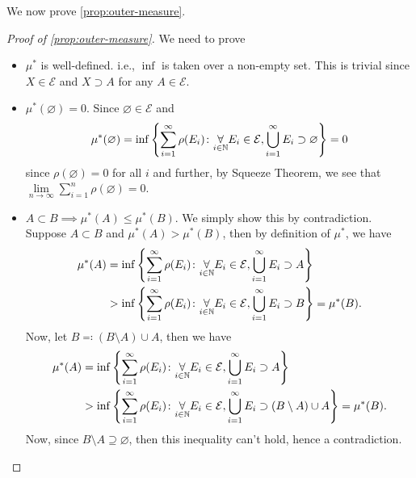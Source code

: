 We now prove \autoref{prop:outer-measure}.
\begin{proof}[Proof of \autoref{prop:outer-measure}]
	We need to prove
	\begin{itemize}
		\item \(\mu^{*} \) is well-defined. i.e., \(\inf\) is taken over a non-empty set. This is trivial since \(X\in \mathcal{E}\) and \(X\supset A\) for any \(A\in \mathcal{E}\).
		\item \(\mu^{*} (\varnothing ) = 0\). Since \(\varnothing \in \mathcal{E}\) and
		      \[
			      \mu^{*} (\varnothing ) = \inf \left\{\sum\limits_{i=1}^{\infty} \rho(E_{i})\colon \underset{i\in \mathbb{\MakeUppercase{N}} }{\forall}E_{i}\in \mathcal{E} , \bigcup\limits_{i=1}^{\infty} E_{i}\supset \varnothing \right\} = 0
		      \]
		      since \(\rho(\varnothing ) = 0\) for all \(i\) and further, by Squeeze Theorem, we see that \(\lim\limits_{n \to \infty} \sum\limits_{i=1}^{n} \rho(\varnothing) = 0\).
		\item \(A\subset B\implies \mu^{*} (A)\leq \mu^{*} (B)\). We simply show this by contradiction. Suppose \(A\subset B\) and \(\mu^{*} (A)>  \mu^{*} (B)\), then by
		      definition of \(\mu^{*} \), we have
		      \[
			      \begin{split}
				      \mu^{*} (A) &= \inf\left\{\sum\limits_{i=1}^{\infty} \rho(E_{i})\colon \underset{i\in\mathbb{\MakeUppercase{N}}}{\forall}E_{i}\in \mathcal{E},\bigcup\limits_{i=1}^{\infty} E_{i}\supset A \right\}\\
				      &>\inf\left\{\sum\limits_{i=1}^{\infty} \rho(E_{i})\colon \underset{i\in\mathbb{\MakeUppercase{N}}}{\forall}E_{i}\in \mathcal{E},\bigcup\limits_{i=1}^{\infty} E_{i}\supset B \right\} = \mu^{*} (B).
			      \end{split}
		      \]
		      Now, let \(B \eqqcolon (B\setminus A)\cup A\), then we have
		      \[
			      \begin{split}
				      \mu^{*} (A) &= \inf\left\{\sum\limits_{i=1}^{\infty} \rho(E_{i})\colon \underset{i\in\mathbb{\MakeUppercase{N}}}{\forall}E_{i}\in \mathcal{E},\bigcup\limits_{i=1}^{\infty} E_{i}\supset A \right\}\\
				      &>\inf\left\{\sum\limits_{i=1}^{\infty} \rho(E_{i})\colon \underset{i\in\mathbb{\MakeUppercase{N}}}{\forall}E_{i}\in \mathcal{E},\bigcup\limits_{i=1}^{\infty} E_{i}\supset (B\setminus A)\cup A \right\} = \mu^{*} (B).
			      \end{split}
		      \]
		      Now, since \(B\setminus A\supseteq \varnothing \), then this inequality can't hold, hence a contradiction\conta.

\end{itemize}
\end{proof}
